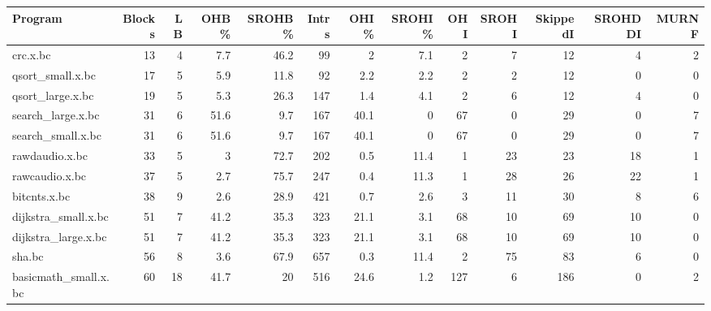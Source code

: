 \begin{tabular}{|l|r|r|r|r|r|r|r|r|r|r|r|r|}
\hline
 Program              &   Blocks &   LB &   OHB\% &   SROHB\% &   Intrs &   OHI\% &   SROHI\% &   OHI &   SROHI &   SkippedI &   SROHDDI &   MURNF \\
\hline
 crc.x.bc             &       13 &    4 &    7.7 &     46.2 &      99 &    2   &      7.1 &     2 &       7 &         12 &         4 &       2 \\
\hline
 qsort\_small.x.bc     &       17 &    5 &    5.9 &     11.8 &      92 &    2.2 &      2.2 &     2 &       2 &         12 &         0 &       0 \\
\hline
 qsort\_large.x.bc     &       19 &    5 &    5.3 &     26.3 &     147 &    1.4 &      4.1 &     2 &       6 &         12 &         4 &       0 \\
\hline
 search\_large.x.bc    &       31 &    6 &   51.6 &      9.7 &     167 &   40.1 &      0   &    67 &       0 &         29 &         0 &       7 \\
\hline
 search\_small.x.bc    &       31 &    6 &   51.6 &      9.7 &     167 &   40.1 &      0   &    67 &       0 &         29 &         0 &       7 \\
\hline
 rawdaudio.x.bc       &       33 &    5 &    3   &     72.7 &     202 &    0.5 &     11.4 &     1 &      23 &         23 &        18 &       1 \\
\hline
 rawcaudio.x.bc       &       37 &    5 &    2.7 &     75.7 &     247 &    0.4 &     11.3 &     1 &      28 &         26 &        22 &       1 \\
\hline
 bitcnts.x.bc         &       38 &    9 &    2.6 &     28.9 &     421 &    0.7 &      2.6 &     3 &      11 &         30 &         8 &       6 \\
\hline
 dijkstra\_small.x.bc  &       51 &    7 &   41.2 &     35.3 &     323 &   21.1 &      3.1 &    68 &      10 &         69 &        10 &       0 \\
\hline
 dijkstra\_large.x.bc  &       51 &    7 &   41.2 &     35.3 &     323 &   21.1 &      3.1 &    68 &      10 &         69 &        10 &       0 \\
\hline
 sha.bc               &       56 &    8 &    3.6 &     67.9 &     657 &    0.3 &     11.4 &     2 &      75 &         83 &         6 &       0 \\
\hline
 basicmath\_small.x.bc &       60 &   18 &   41.7 &     20   &     516 &   24.6 &      1.2 &   127 &       6 &        186 &         0 &       2 \\

\end{tabular}
